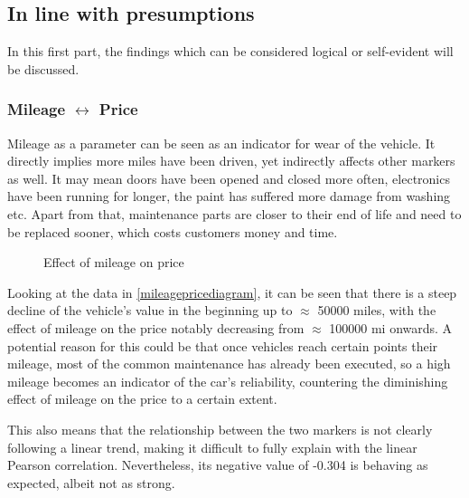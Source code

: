 \subsection{In line with presumptions}
In this first part, the findings which can be considered logical or self-evident will be discussed.
\subsubsection{Mileage $\leftrightarrow$ Price}
Mileage as a parameter can be seen as an indicator for wear of the vehicle. It directly implies more miles have been driven,
yet indirectly affects other markers as well. It may mean doors have been opened and closed more often,
electronics have been running for longer, the paint has suffered more damage from washing etc.
Apart from that, maintenance parts are closer to their end of life and need to be replaced sooner,
which costs customers money and time.
\begin{figure}[H]
    \caption{Effect of mileage on price}
    \label{mileagepricediagram}
\end{figure}
Looking at the data in \autoref{mileagepricediagram}, it can be seen that there is a steep decline of the vehicle's value in the beginning up to $\approx$ 50000 miles,
with the effect of mileage on the price notably decreasing from $\approx$ 100000 mi onwards.
A potential reason for this could be that once vehicles reach certain points their mileage, most of the common maintenance has already been executed, so
a high mileage becomes an indicator of the car's reliability, countering the diminishing effect of mileage on the price to a certain extent.
\par
This also means that the relationship between the two markers is not clearly following a linear trend, making it difficult to fully explain with
the linear Pearson correlation. 
Nevertheless, its negative value of -0.304 is behaving as expected, albeit not as strong.
